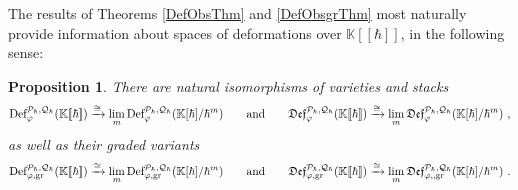 \documentclass[11pt]{amsart}
\numberwithin{equation}{section}
\newtheorem{prop}[theo]{Proposition}
\theoremstyle{definition}
\newcommand{\bb}{\mathbb}
\newcommand{\Def}{{\textup{Def}}}
\newcommand{\fDef}{{\mathfrak{Def}}}
\newcommand{\Ph}{{\mathcal{P}_\hbar}}
\newcommand{\Qh}{{\mathcal{Q}_\hbar}}
\newcommand{\fph}{{[\![\hbar]\!]}}
\newcommand{\gd}{{\textup{gr}}}
\newcommand{\K}{{\bb K}}
\newcommand{\0}{{\textbf{0}}}
\begin{document}
The results of Theorems \ref{DefObsThm} and \ref{DefObsgrThm} most naturally provide information about spaces of deformations over $\K\fph$, in the following sense:
\begin{prop}\label{Deflimgrprop} 
There are natural isomorphisms of varieties and stacks
	\[  \Def_{\varphi}^{\Ph,\Qh}(\K\fph)\xrightarrow{\cong }  \lim_{m} \Def_\varphi^{\Ph,\Qh}(\K[\hbar]/\hbar^{m}) \qquad \text{and}\qquad \fDef_{\varphi}^{\Ph,\Qh}(\K\fph) \xrightarrow{\cong } \lim_{m} \fDef_\varphi^{\Ph,\Qh}(\K[\hbar]/\hbar^{m})  \ ,  \]
	as well as their graded variants
	\[  \Def_{\varphi,\gd}^{\Ph,\Qh}(\K\fph) \xrightarrow{\cong } \lim_{m} \Def_{\varphi,\gd}^{\Ph,\Qh}(\K[\hbar]/\hbar^{m}) \qquad \text{and}\qquad \fDef_{\varphi,\gd}^{\Ph,\Qh}(\K\fph) \xrightarrow{\cong } \lim_{m} \fDef_{\varphi,,\gd}^{\Ph,\Qh}(\K[\hbar]/\hbar^{m})  \ .  \]
\end{prop}
\end{document}
